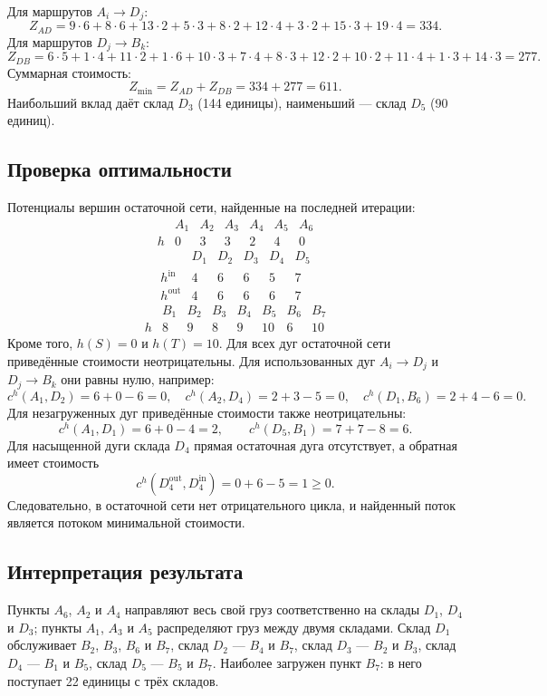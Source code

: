 Для маршрутов $A_i\to D_j$:
\[
Z_{AD}=9\cdot6+8\cdot6+13\cdot2+5\cdot3+8\cdot2
      +12\cdot4+3\cdot2+15\cdot3+19\cdot4=334.
\]
Для маршрутов $D_j\to B_k$:
\[
Z_{DB}=6\cdot5+1\cdot4+11\cdot2+1\cdot6+10\cdot3+7\cdot4
      +8\cdot3+12\cdot2+10\cdot2+11\cdot4+1\cdot3+14\cdot3=277.
\]
Суммарная стоимость:
\[
Z_{\min}=Z_{AD}+Z_{DB}=334+277=611.
\]
Наибольший вклад даёт склад $D_3$ (144 единицы), наименьший --- склад
$D_5$ (90 единиц).

\subsection*{Проверка оптимальности}

Потенциалы вершин остаточной сети, найденные на последней итерации:
\[
\begin{array}{c|cccccc}
 & A_1&A_2&A_3&A_4&A_5&A_6\\ \hline
h & 0&3&3&2&4&0
\end{array}
\]
\[
\begin{array}{c|ccccc}
 & D_1&D_2&D_3&D_4&D_5\\ \hline
h^{\mathrm{in}}  & 4&6&6&5&7\\
h^{\mathrm{out}} & 4&6&6&6&7
\end{array}
\]
\[
\begin{array}{c|ccccccc}
 & B_1&B_2&B_3&B_4&B_5&B_6&B_7\\ \hline
h & 8&9&8&9&10&6&10
\end{array}
\]
Кроме того, $h(S)=0$ и $h(T)=10$. Для всех дуг остаточной сети приведённые
стоимости неотрицательны. Для использованных дуг $A_i\to D_j$ и
$D_j\to B_k$ они равны нулю, например:
\[
c^{h}(A_1,D_2)=6+0-6=0,\quad
c^{h}(A_2,D_4)=2+3-5=0,\quad
c^{h}(D_1,B_6)=2+4-6=0.
\]
Для незагруженных дуг приведённые стоимости также неотрицательны:
\[
c^{h}(A_1,D_1)=6+0-4=2,\qquad
c^{h}(D_5,B_1)=7+7-8=6.
\]
Для насыщенной дуги склада $D_4$ прямая остаточная дуга отсутствует, а
обратная имеет стоимость
\[
c^{h}(D_4^{\mathrm{out}},D_4^{\mathrm{in}})=0+6-5=1\ge0.
\]
Следовательно, в остаточной сети нет отрицательного цикла, и найденный
поток является потоком минимальной стоимости.

\subsection*{Интерпретация результата}

Пункты $A_6$, $A_2$ и $A_4$ направляют весь свой груз соответственно на
склады $D_1$, $D_4$ и $D_3$; пункты $A_1$, $A_3$ и $A_5$ распределяют
груз между двумя складами. Склад $D_1$ обслуживает $B_2$, $B_3$, $B_6$ и
$B_7$, склад $D_2$ --- $B_4$ и $B_7$, склад $D_3$ --- $B_2$ и $B_3$,
склад $D_4$ --- $B_1$ и $B_5$, склад $D_5$ --- $B_5$ и $B_7$. Наиболее
загружен пункт $B_7$: в него поступает 22 единицы с трёх складов.

